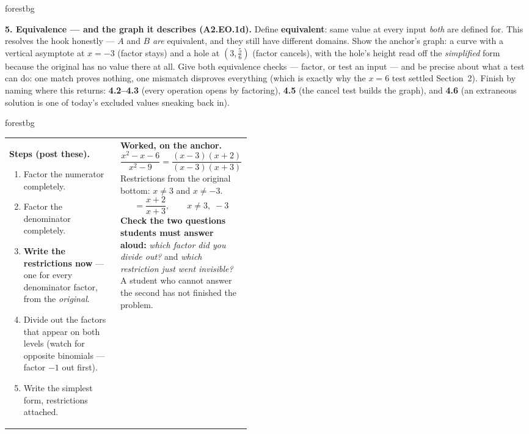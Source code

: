\documentclass[10pt]{article}
\begin{document}
\begin{skillbox}[Lesson]{forestbg}
\begin{multicols}{2}
\textbf{5. Equivalence --- and the graph it describes (A2.EO.1d).} Define \textbf{equivalent}: same
value at every input \emph{both} are defined for. This resolves the hook honestly --- $A$ and $B$
\emph{are} equivalent, and they still have different domains. Show the anchor's graph: a curve with a
vertical asymptote at $x=-3$ (factor stays) and a hole at $\left(3,\tfrac56\right)$ (factor cancels),
with the hole's height read off the \emph{simplified} form because the original has no value there at
all. Give both equivalence checks --- factor, or test an input --- and be precise about what a test
can do: one match proves nothing, one mismatch disproves everything (which is exactly why the $x=6$
test settled Section~2). Finish by naming where this returns: \textbf{4.2--4.3} (every operation opens
by factoring), \textbf{4.5} (the cancel test builds the graph), and \textbf{4.6} (an extraneous
solution is one of today's excluded values sneaking back in).
\end{multicols}
\end{skillbox}

\begin{skillbox}{forestbg}
\begin{tabularx}{\linewidth}{@{}p{0.46\linewidth} X@{}}
\vspace{0pt}
\textbf{Steps (post these).}
\begin{enumerate}[leftmargin=1.3em, nosep, after=\vspace{2pt}]
  \item Factor the numerator completely.
  \item Factor the denominator completely.
  \item \textbf{Write the restrictions now} --- one for every denominator factor, from the
        \emph{original}.
  \item Divide out the factors that appear on both levels (watch for opposite binomials --- factor
        $-1$ out first).
  \item Write the simplest form, restrictions attached.
\end{enumerate}
&
\vspace{0pt}
\textbf{Worked, on the anchor.}
\[ \frac{x^2-x-6}{x^2-9}=\frac{(x-3)(x+2)}{(x-3)(x+3)} \]
Restrictions from the original bottom: $x\neq3$ and $x\neq-3$.
\[ =\frac{x+2}{x+3}, \qquad x\neq3,\;-3 \]
\textbf{Check the two questions students must answer aloud:} \emph{which factor did you divide out?}
and \emph{which restriction just went invisible?} A student who cannot answer the second has not
finished the problem.
\end{tabularx}
\end{skillbox}
\end{document}
